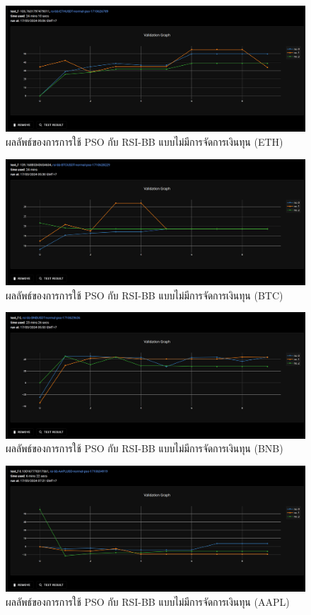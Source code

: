 \begin{figure}[ht]
    \centering
    \includegraphics[width=\textwidth]{images/pso/rsi-bb/eth-normal.png}
    \caption{ผลลัพธ์ของการการใช้ PSO กับ RSI-BB แบบไม่มีการจัดการเงินทุน (ETH)}
\end{figure}
\begin{figure}[ht]
    \centering
    \includegraphics[width=\textwidth]{images/pso/rsi-bb/btc-normal.png}
    \caption{ผลลัพธ์ของการการใช้ PSO กับ RSI-BB แบบไม่มีการจัดการเงินทุน (BTC)}
\end{figure}
\begin{figure}[ht]
    \centering
    \includegraphics[width=\textwidth]{images/pso/rsi-bb/bnb-normal.png}
    \caption{ผลลัพธ์ของการการใช้ PSO กับ RSI-BB แบบไม่มีการจัดการเงินทุน (BNB)}
\end{figure}
\begin{figure}[ht]
    \centering
    \includegraphics[width=\textwidth]{images/pso/rsi-bb/aapl-normal.png}
    \caption{ผลลัพธ์ของการการใช้ PSO กับ RSI-BB แบบไม่มีการจัดการเงินทุน (AAPL)}
\end{figure}
